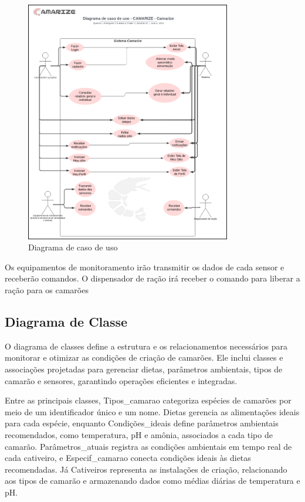\documentclass[
  a4paper,
  12pt,
  english,
  brazilian,
]{article}
\begin{document}
\begin{figure}[!h]
\centering
\caption{Diagrama de caso de uso}%
\label{fig:diagrama-caso-uso}
 \includegraphics[width=0.8\textwidth]{Imagem/Caso de Uso.png}
\end{figure}

    \newpage
    
    Os equipamentos de monitoramento irão transmitir os dados de cada sensor e receberão comandos. O dispensador de ração irá receber o comando para liberar a ração para os camarões

    \newpage

    \subsection*{\textbf{Diagrama de Classe}}

O diagrama de classes define a estrutura e os relacionamentos necessários para monitorar e otimizar as condições de criação de camarões. Ele inclui classes e associações projetadas para gerenciar dietas, parâmetros ambientais, tipos de camarão e sensores, garantindo operações eficientes e integradas.

Entre as principais classes, Tipos\_camarao categoriza espécies de camarões por meio de um identificador único e um nome. Dietas gerencia as alimentações ideais para cada espécie, enquanto Condições\_ideais define parâmetros ambientais recomendados, como temperatura, pH e amônia, associados a cada tipo de camarão. Parâmetros\_atuais registra as condições ambientais em tempo real de cada cativeiro, e Especif\_camarao conecta condições ideais às dietas recomendadas. Já Cativeiros representa as instalações de criação, relacionando aos tipos de camarão e armazenando dados como médias diárias de temperatura e pH.
\end{document}
